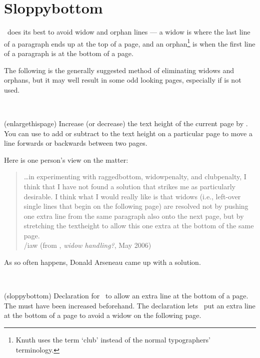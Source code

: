 \section{Sloppybottom}

    \tx\ does its best to avoid widow and orphan lines --- a widow is where 
the last line of a paragraph ends up at the top of a page, and an 
orphan\footnote{Knuth uses the term `club' instead of the normal typographers'
terminology.} 
is when the first line of a paragraph is at the bottom of a page.

    The following is the generally suggested method of eliminating widows 
and orphans, but it may well result in some odd looking pages, especially
if \cmd{\raggedbottom} is not used.
\begin{lcode}
\raggedbottom
\end{lcode}

\begin{syntax}
\cmd{\enlargethispage} \\
\end{syntax}
\glossary(enlargethispage)%
  {}%
  {Increase (or decrease) the text height of the current page by .}
    You can use \cmd{\enlargethispage} to add or subtract to the text height
on a particular page to move a line forwards or backwards between two pages.


 Here is one person's view on the matter:
\begin{quote}
\ldots in experimenting with raggedbottom, widowpenalty, and clubpenalty,
I think that I have not found a solution that strikes me as particularly
desirable. I think what I would really like is that widows (i.e., left-over
single lines that begin on the following page) are resolved not by pushing
one extra line from the same paragraph also onto the next page, but by
stretching the textheight to allow this one extra at the bottom of the
same page. \\
\hfill /iaw (from \ctt, \textit{widow handling?}, May 2006)
\end{quote}

As so often happens, Donald Arseneau 
came up with a solution.

\begin{syntax}
\cmd{\sloppybottom} \\
\end{syntax}
\glossary(sloppybottom)%
  {}%
  {Declaration for \tx\ to allow an extra line at the bottom of a page.
   The  must have been increased beforehand.}%
The declaration \cmd{\sloppybottom} lets \tx\ put an extra line at
the bottom of a page to avoid a widow on the following page. 

